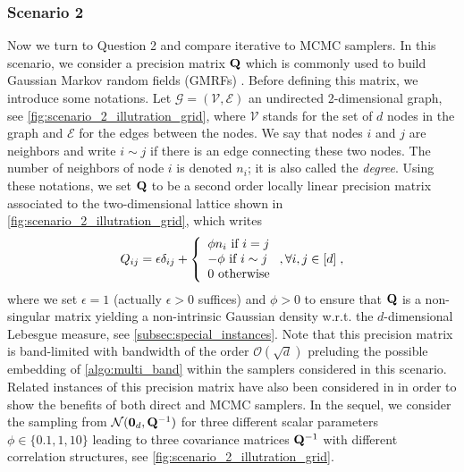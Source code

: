 \documentclass[nohypdvips,onefignum,onetabnum]{siamart171218}
\begin{document}
\subsubsection{Scenario 2}
\label{subsec:scenario2}
Now we turn to Question 2 and compare iterative to MCMC samplers. 
In this scenario, we consider a precision matrix $\mathbf{Q}$ which is commonly used to build Gaussian Markov random fields (GMRFs) \cite{Rue2005}.
Before defining this matrix, we introduce some notations.
Let $\mathcal{G} = (\mathcal{V},\mathcal{E})$ an undirected 2-dimensional graph, see \cref{fig:scenario_2_illutration_grid}, where $\mathcal{V}$ stands for the set of $d$ nodes in the graph and $\mathcal{E}$ for the edges between the nodes.
We say that nodes $i$ and $j$ are neighbors and write $i \sim j$ if there is an edge connecting these two nodes.
The number of neighbors of node $i$ is denoted $n_i$; it is also called the {\em degree}.
Using these notations, we set $\mathbf{Q}$ to be a second order locally linear precision matrix \cite{Higdon2007,Rue2005} associated to the two-dimensional lattice shown in \cref{fig:scenario_2_illutration_grid}, which writes
\begin{equation}
  Q_{ij} = \epsilon\delta_{ij} + \left\{
                \begin{array}{ll}
                  \phi n_i \ \text{if} \ i=j\\
                  -\phi \ \text{if} \ i \sim j\\
                  0 \ \text{otherwise}
                \end{array}
              \right., \forall i,j \in [d]\eqsp,\label{eq:simu1_ex2}
\end{equation}
where we set $\epsilon = 1$ (actually $\epsilon > 0$ suffices) and $\phi>0$ to ensure that $\mathbf{Q}$ is a non-singular matrix yielding a non-intrinsic Gaussian density w.r.t. the $d$-dimensional Lebesgue measure, see \cref{subsec:special_instances}. 
Note that this precision matrix is band-limited with bandwidth of the order $\mathcal{O}(\sqrt{d})$ \cite{Rue2005} preluding the possible embedding of \cref{algo:multi_band} within the samplers considered in this scenario.
Related instances of this precision matrix have also been considered in \cite{Ilic2009,Parker2012,Fox2017} in order to show the benefits of both direct and MCMC samplers.
In the sequel, we consider the sampling from $\mathcal{N}(\mathbf{0}_d,\mathbf{Q}^{-1})$ for three different scalar parameters $\phi \in \{0.1,1,10\}$ leading to three covariance matrices $\mathbf{Q}^{-1}$ with different correlation structures, see \cref{fig:scenario_2_illutration_grid}.
\end{document}
